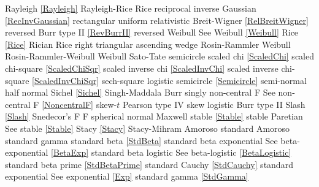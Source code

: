 %
Rayleigh  						\dotfill	\eqref{Rayleigh}					\ncite	%
Rayleigh-Rice					\dotfill	Rice								\ncite
reciprocal inverse Gaussian		\dotfill	\eqref{RecInvGaussian}				\ncite
rectangular						\dotfill	uniform 							\ncite	%
relativistic Breit-Wigner		\dotfill	\eqref{RelBreitWigner}				\ncite	%
reversed Burr type II			\dotfill	\eqref{RevBurrII} 					\ncite	%
reversed Weibull				\dotfill	See Weibull \eqref{Weibull}			\ncite	%
Rice							\dotfill	\eqref{Rice}						\ncite
Rician							\dotfill	Rice								\ncite
right triangular				\dotfill	ascending wedge 					\ncite	%
Rosin-Rammler 					\dotfill	Weibull								\mcite{Rosin1933}   		%
Rosin-Rammler-Weibull 			\dotfill	Weibull								\ncite	%
%
Sato-Tate						\dotfill	semicircle 							\ncite	%
scaled chi						\dotfill	\eqref{ScaledChi}					\ncite	%
scaled chi-square 				\dotfill	\eqref{ScaledChiSqr}				\ncite	%
scaled inverse chi 				\dotfill	\eqref{ScaledInvChi}				\ncite	%
scaled inverse chi-square 		\dotfill	\eqref{ScaledInvChiSqr}				 	%
sech-square 					\dotfill	logistic							\ncite	%
semicircle						\dotfill	\eqref{Semicircle}					\ncite	%
semi-normal 					\dotfill	half normal 						\ncite	%
Sichel							\dotfill	\eqref{Sichel}						\ncite	
Singh-Maddala 					\dotfill	Burr 								\ncite	%
singly non-central F       		\dotfill	See non-central F  \eqref{NoncentralF}	\ncite 
skew-$t$						\dotfill	Pearson type IV 					\ncite	%
skew logistic					\dotfill	Burr type II 						\ncite	%
Slash							\dotfill	\eqref{Slash}						\ncite
Snedecor's F  					\dotfill	F 									\ncite	%
spherical normal				\dotfill	Maxwell								\ncite	%
stable							\dotfill	\eqref{Stable}						\ncite
stable Paretian 				\dotfill	See stable \eqref{Stable}			\ncite
Stacy 							\dotfill	\eqref{Stacy} 						\ncite	%
Stacy-Mihram					\dotfill	Amoroso								\ncite	%
standard Amoroso				\dotfill	standard gamma 						\ncite	%
standard beta					\dotfill	\eqref{StdBeta} 					\ncite	%
standard beta exponential		\dotfill	See beta-exponential \eqref{BetaExp}	\ncite	%
standard beta logistic			\dotfill	See beta-logistic \eqref{BetaLogistic}		\ncite	%
standard beta prime				\dotfill	\eqref{StdBetaPrime}				\ncite	%
standard Cauchy					\dotfill	\eqref{StdCauchy} 					\ncite	%
standard exponential			\dotfill	See exponential \eqref{Exp} 		\ncite	%
standard gamma 					\dotfill	\eqref{StdGamma} 					\ncite	%

